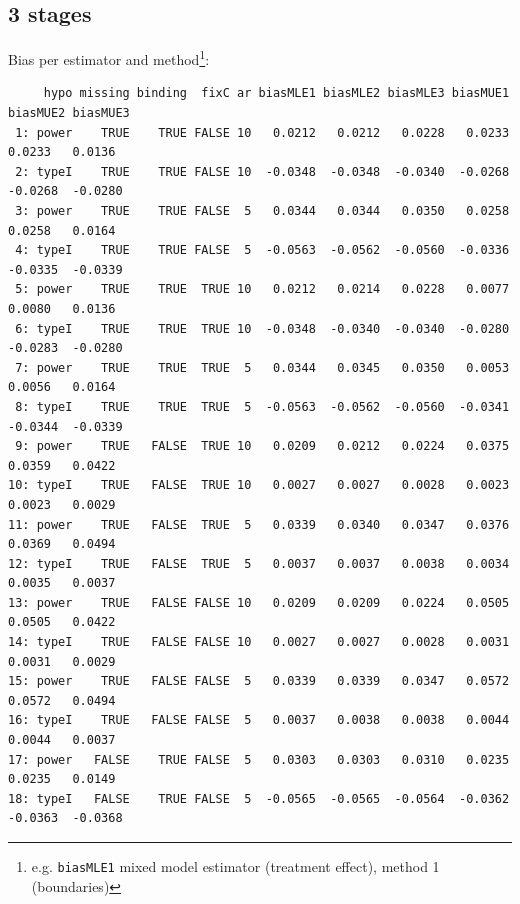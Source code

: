 \documentclass[12pt]{article}
\begin{document}
\subsection{3 stages}
\label{sec:orgf5c49ff}
Bias per estimator and method\footnote{e.g. \texttt{biasMLE1} mixed model
estimator (treatment effect), method 1 (boundaries)}:
\begin{adjustwidth}{-1cm}{-1cm}
\begin{verbatim}
     hypo missing binding  fixC ar biasMLE1 biasMLE2 biasMLE3 biasMUE1 biasMUE2 biasMUE3
 1: power    TRUE    TRUE FALSE 10   0.0212   0.0212   0.0228   0.0233   0.0233   0.0136
 2: typeI    TRUE    TRUE FALSE 10  -0.0348  -0.0348  -0.0340  -0.0268  -0.0268  -0.0280
 3: power    TRUE    TRUE FALSE  5   0.0344   0.0344   0.0350   0.0258   0.0258   0.0164
 4: typeI    TRUE    TRUE FALSE  5  -0.0563  -0.0562  -0.0560  -0.0336  -0.0335  -0.0339
 5: power    TRUE    TRUE  TRUE 10   0.0212   0.0214   0.0228   0.0077   0.0080   0.0136
 6: typeI    TRUE    TRUE  TRUE 10  -0.0348  -0.0340  -0.0340  -0.0280  -0.0283  -0.0280
 7: power    TRUE    TRUE  TRUE  5   0.0344   0.0345   0.0350   0.0053   0.0056   0.0164
 8: typeI    TRUE    TRUE  TRUE  5  -0.0563  -0.0562  -0.0560  -0.0341  -0.0344  -0.0339
 9: power    TRUE   FALSE  TRUE 10   0.0209   0.0212   0.0224   0.0375   0.0359   0.0422
10: typeI    TRUE   FALSE  TRUE 10   0.0027   0.0027   0.0028   0.0023   0.0023   0.0029
11: power    TRUE   FALSE  TRUE  5   0.0339   0.0340   0.0347   0.0376   0.0369   0.0494
12: typeI    TRUE   FALSE  TRUE  5   0.0037   0.0037   0.0038   0.0034   0.0035   0.0037
13: power    TRUE   FALSE FALSE 10   0.0209   0.0209   0.0224   0.0505   0.0505   0.0422
14: typeI    TRUE   FALSE FALSE 10   0.0027   0.0027   0.0028   0.0031   0.0031   0.0029
15: power    TRUE   FALSE FALSE  5   0.0339   0.0339   0.0347   0.0572   0.0572   0.0494
16: typeI    TRUE   FALSE FALSE  5   0.0037   0.0038   0.0038   0.0044   0.0044   0.0037
17: power   FALSE    TRUE FALSE  5   0.0303   0.0303   0.0310   0.0235   0.0235   0.0149
18: typeI   FALSE    TRUE FALSE  5  -0.0565  -0.0565  -0.0564  -0.0362  -0.0363  -0.0368
\end{verbatim}
\end{adjustwidth}
\end{document}
